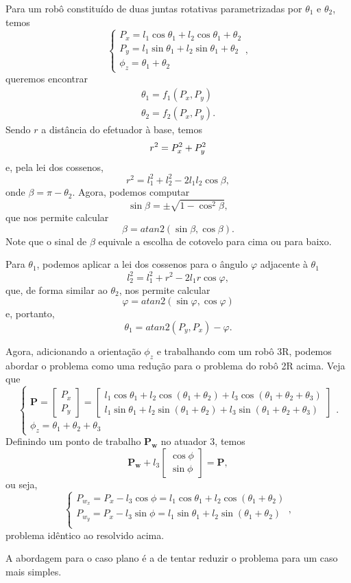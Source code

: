 
Para um robô constituído de duas juntas rotativas parametrizadas por $\theta_1$ e $\theta_2$, temos \[
\begin{cases}
    P_x = l_1\cos\theta_1 + l_2 \cos\theta_1+\theta_2 \\
    P_y = l_1\sin\theta_1 + l_2 \sin\theta_1+\theta_2 \\
    \phi_z = \theta_1 + \theta_2
\end{cases}
,\] queremos encontrar
\begin{align*}
\theta_1 = f_1\left( P_x, P_y \right) \\
\theta_2 = f_2\left( P_x, P_y \right) 
.\end{align*}
Sendo $r$ a distância do efetuador à base, temos \[
    r^2 = P_x^2 + P_y^2 \\
\] e, pela lei dos cossenos, \[
r^2 = l_1^2+l_2^2 -2l_1l_2\cos\beta 
,\] onde $\beta = \pi-\theta_2$. Agora, podemos computar \[
\sin\beta = \pm\sqrt{1-\cos^2\beta} 
,\] que nos permite calcular \[
\beta = atan2\left( \sin\beta, \cos\beta \right) 
.\] Note que o sinal de $\beta$ equivale a escolha de cotovelo para cima ou para baixo.

Para $\theta_1$, podemos aplicar a lei dos cossenos para o ângulo $\varphi$ adjacente à $\theta_1$ \[
    l_2^2 = l_1^2 + r^2 - 2l_1r\cos\varphi
,\] que, de forma similar ao $\theta_2$, nos permite calcular \[
\varphi = atan2\left( \sin\varphi, \cos\varphi \right) 
\] e, portanto, \[
\theta_1 = atan2\left( P_y, P_x \right) -\varphi
.\] 

Agora, adicionando a orientação $\phi_z$ e trabalhando com um robô 3R, podemos abordar o problema como uma redução para o problema do robô 2R acima. Veja que \[
\begin{cases}
    \bm{P} = \begin{bmatrix} P_x \\ P_y \end{bmatrix} = \begin{bmatrix} 
    l_1\cos\theta_1 + l_2\cos\left( \theta_1 +\theta_2 \right) +l_3\cos\left( \theta_1 + \theta_2 + \theta_3 \right) \\
    l_1\sin\theta_1 + l_2\sin\left( \theta_1 +\theta_2 \right) +l_3\sin\left( \theta_1 + \theta_2 + \theta_3 \right)
\end{bmatrix} \\
\phi_z = \theta_1 + \theta_2 + \theta_3
\end{cases}
.\] Definindo um ponto de trabalho $\bm{P_w}$ no atuador 3, temos \[
\bm{P_w} + l_3\begin{bmatrix} \cos\phi \\ \sin\phi \end{bmatrix} = \bm{P}
,\] ou seja, \[
\begin{cases}
    P_{w_x} = P_x - l_3\cos\phi = l_1 \cos\theta_1 + l_2\cos\left( \theta_1 + \theta_2 \right) \\
    P_{w_y} = P_x - l_3\sin\phi = l_1 \sin\theta_1 + l_2\sin\left( \theta_1 + \theta_2 \right) \\
\end{cases}
,\] problema idêntico ao resolvido acima.

A abordagem para o caso plano é a de tentar reduzir o problema para um caso mais simples.

